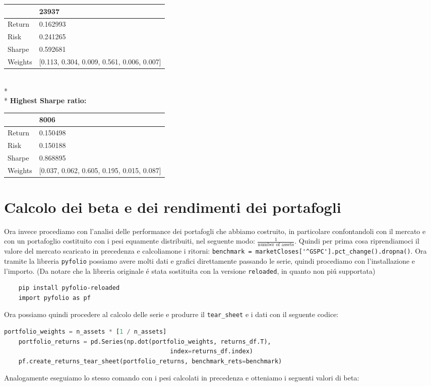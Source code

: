 \documentclass{report}
\begin{document}
\begin{tabular}{ll}
\toprule
{} &                                       23937 \\
\midrule
Return  &                                    0.162993 \\
Risk    &                                    0.241265 \\
Sharpe  &                                    0.592681 \\
Weights &  [0.113, 0.304, 0.009, 0.561, 0.006, 0.007] \\
\bottomrule
\end{tabular}
\\*
\\*
\textbf{Highest Sharpe ratio:}

\begin{tabular}{ll}
\toprule
{} &                                        8006 \\
\midrule
Return  &                                    0.150498 \\
Risk    &                                    0.150188 \\
Sharpe  &                                    0.868895 \\
Weights &  [0.037, 0.062, 0.605, 0.195, 0.015, 0.087] \\
\bottomrule
\end{tabular}


\section{Calcolo dei beta e dei rendimenti dei portafogli}

Ora invece procediamo con l'analisi delle performance dei portafogli che abbiamo costruito, in particolare confontandoli con il mercato e con un portafoglio costituito con i pesi equamente distribuiti, nel seguente modo:  \(\frac{1}{\text{number of assets}}\). Quindi per prima cosa riprendiamoci il valore del mercato scaricato in precedenza e calcoliamone i ritorni: \lstinline{benchmark = marketCloses['^GSPC'].pct_change().dropna()}. Ora tramite la libreria \lstinline{pyfolio} possiamo avere molti dati e grafici direttamente passando le serie, quindi procediamo con l'installazione e l'importo. (Da notare che la libreria originale é stata sostituita con la versione \lstinline{reloaded}, in quanto non piú supportata)
\begin{lstlisting}
    pip install pyfolio-reloaded
    import pyfolio as pf
\end{lstlisting}
Ora possiamo quindi procedere al calcolo delle serie e produrre il \lstinline{tear_sheet} e i dati con il seguente codice:
\begin{lstlisting}[language=python]
    portfolio_weights = n_assets * [1 / n_assets]
    portfolio_returns = pd.Series(np.dot(portfolio_weights, returns_df.T),
                                              index=returns_df.index)
    pf.create_returns_tear_sheet(portfolio_returns, benchmark_rets=benchmark)
\end{lstlisting}
 Analogamente eseguiamo lo stesso comando con i pesi calcolati in precedenza
 e otteniamo i seguenti valori di beta:
\end{document}
